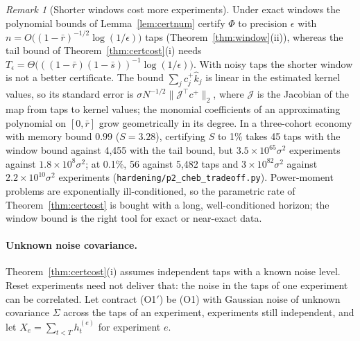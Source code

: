\documentclass[12pt]{article}
\theoremstyle{definition}
\theoremstyle{remark}
\newtheorem{remark}[theorem]{Remark}
\begin{document}
\begin{remark}[Shorter windows cost more experiments]\label{rem:cheb}
Under exact windows the polynomial bounds of Lemma~\ref{lem:certnum} certify $\Phi$ to precision $\epsilon$ with $n=O\bigl((1-\bar r)^{-1/2}\log(1/\epsilon)\bigr)$ taps (Theorem~\ref{thm:window}(ii)), whereas the tail bound of Theorem~\ref{thm:certcost}(i) needs $T_\epsilon=\Theta\bigl(((1-\bar r)(1-\bar s))^{-1}\log(1/\epsilon)\bigr)$. With noisy taps the shorter window is not a better certificate. The bound $\sum_jc^+_j\hat k_j$ is linear in the estimated kernel values, so its standard error is $\sigma N^{-1/2}\|\mathcal J^\top c^+\|_2$, where $\mathcal J$ is the Jacobian of the map from taps to kernel values; the monomial coefficients of an approximating polynomial on $[0,\bar r]$ grow geometrically in its degree. In a three-cohort economy with memory bound $0.99$ ($S=3.28$), certifying $S$ to 1\% takes 45 taps with the window bound against 4{,}455 with the tail bound, but $3.5\times10^{65}\sigma^2$ experiments against $1.8\times10^{8}\sigma^2$; at 0.1\%, 56 against 5{,}482 taps and $3\times10^{82}\sigma^2$ against $2.2\times10^{10}\sigma^2$ experiments (\texttt{hardening/p2\_cheb\_tradeoff.py}). Power-moment problems are exponentially ill-conditioned, so the parametric rate of Theorem~\ref{thm:certcost} is bought with a long, well-conditioned horizon; the window bound is the right tool for exact or near-exact data.
\end{remark}

\paragraph{Unknown noise covariance.} Theorem~\ref{thm:certcost}(i) assumes independent taps with a known noise level. Reset experiments need not deliver that: the noise in the taps of one experiment can be correlated. Let contract (O1$'$) be (O1) with Gaussian noise of unknown covariance $\Sigma$ across the taps of an experiment, experiments still independent, and let $X_e=\sum_{t<T}h^{(e)}_t$ for experiment $e$.
\end{document}
